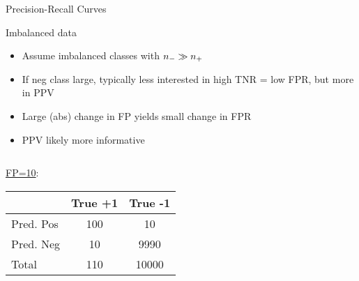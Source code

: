 \documentclass[11pt,compress,t,notes=noshow, xcolor=table]{beamer}
\begin{document}
\begin{frame}{Precision-Recall Curves}


\end{frame}

\begin{vbframe}{Imbalanced data}

\begin{itemize}
     \item Assume imbalanced classes with $n_{-} \gg n_{+}$
     \item If neg class large, typically less interested in high TNR = low FPR,
     but more in PPV
     \item Large (abs) change in FP yields small change in FPR
  \item PPV likely more informative
\end{itemize}

\lz

\begin{columns}
 \begin{column}{0.45\textwidth}
 \underline{FP=10}:\\
 \lz
 {
 \tiny
 \centering
 \tiny
 \begin{tabular}{|l|c|c|}
                 \hline
                & True +1 & True -1 \\ \hline
 Pred. Pos & 100            & 10            \\ \hline
 Pred. Neg & 10            & 9990           \\ \hline
 Total  & 110            & 10000           \\ \hline
 \end{tabular}
 }


\end{column}
\end{columns}
\end{vbframe}
\end{document}
